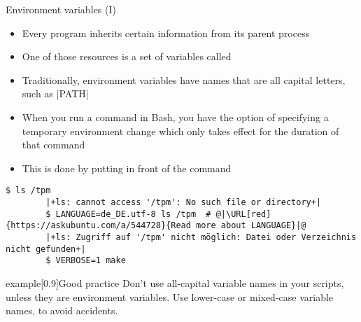 \begin{frame}[fragile]{Environment variables (I)}
    \vspace{-3mm}
    \begin{itemize}
        \item Every program inherits certain information from its parent process 
        \item One of those resources is a set of variables called 
        \item Traditionally, environment variables have names that are all capital letters, such as \bash|PATH|
        \item When you run a command in Bash, you have the option of specifying a temporary environment change which only takes effect for the duration of that command
        \item This is done by putting  in front of the command
    \end{itemize}
    \begin{lstlisting}[style=MyBash]
        $ ls /tpm
        |+ls: cannot access '/tpm': No such file or directory+|
        $ LANGUAGE=de_DE.utf-8 ls /tpm  # @|\URL[red]{https://askubuntu.com/a/544728}{Read more about LANGUAGE}|@
        |+ls: Zugriff auf '/tpm' nicht möglich: Datei oder Verzeichnis nicht gefunden+|
        $ VERBOSE=1 make
    \end{lstlisting}
    \begin{varblock}{example}[0.9\textwidth]{Good practice}
        Don't use all-capital variable names in your scripts, unless they are environment variables.
        Use lower-case or mixed-case variable names, to avoid accidents.
    \end{varblock}
\end{frame}
